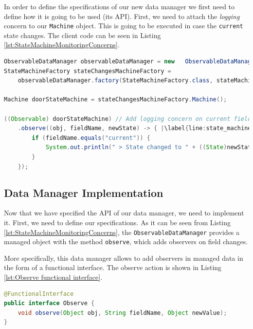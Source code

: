 In order to define the specifications of our new data manager we first need to define how it is going to be used (its API).
First, we need to attach the \textit{logging} concern to our \texttt{Machine} object. 
This is going to be executed in case the \texttt{current} state changes.
The client code can be seen in Listing \ref{lst:StateMachineMonitoringConcerns}.

\begin{sourcecode} [H]
	\begin{lstlisting}[language=Java, escapechar=|]
ObservableDataManager observableDataManager = new 	ObservableDataManager();
StateMachineFactory stateChangesMachineFactory =
	observableDataManager.factory(StateMachineFactory.class, stateMachineSchema);

Machine doorStateMachine = stateChangesMachineFactory.Machine();

((Observable) doorStateMachine) // Add logging concern on current field changes
	.observe((obj, fieldName, newState) -> { |\label{line:state_machine_monitor}|
		if (fieldName.equals("current")) {
			System.out.println(" > State changed to " + ((State)newState).name());
		}
	});
	\end{lstlisting}
	\caption{Door state machine with logging concern}
	\label{lst:StateMachineMonitoringConcerns}
\end{sourcecode}

\subsection{Data Manager Implementation}
Now that we have specified the API of our data manager, we need to implement it.
First, we need to define our specifications.
As it can be seen from Listing \ref{lst:StateMachineMonitoringConcerns}, the \texttt{ObservableDataManager} provides a managed object with the method \texttt{observe}, which adds observers on field changes.

More specifically, this data manager allows to add observers in managed data in the form of a functional interface.
The observe action is shown in Listing \ref{lst:Observe functional interface}.

\begin{sourcecode} [H]
	\begin{lstlisting}[language=Java, escapechar=|]
@FunctionalInterface
public interface Observe {
	void observe(Object obj, String fieldName, Object newValue);
}
	\end{lstlisting}
	\caption{Observe Functional Interface}
	\label{lst:Observe functional interface}
\end{sourcecode}

